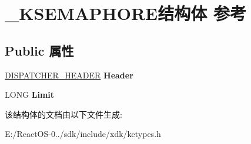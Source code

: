 \hypertarget{struct___k_s_e_m_a_p_h_o_r_e}{}\section{\+\_\+\+K\+S\+E\+M\+A\+P\+H\+O\+R\+E结构体 参考}
\label{struct___k_s_e_m_a_p_h_o_r_e}
\subsection*{Public 属性}
\begin{DoxyCompactItemize}
\item 
\mbox{\label{struct___k_s_e_m_a_p_h_o_r_e_aa6606e1b45d1d1fb1fb7c0e8de4806c9}} 
\hyperlink{struct___d_i_s_p_a_t_c_h_e_r___h_e_a_d_e_r}{D\+I\+S\+P\+A\+T\+C\+H\+E\+R\+\_\+\+H\+E\+A\+D\+ER} {\bfseries Header}
\item 
\mbox{\label{struct___k_s_e_m_a_p_h_o_r_e_a08082bee4c31b7129d69deb26045bd17}} 
L\+O\+NG {\bfseries Limit}
\end{DoxyCompactItemize}


该结构体的文档由以下文件生成\+:\begin{DoxyCompactItemize}
\item 
E\+:/\+React\+O\+S-\/0../sdk/include/xdk/ketypes.\+h\end{DoxyCompactItemize}
